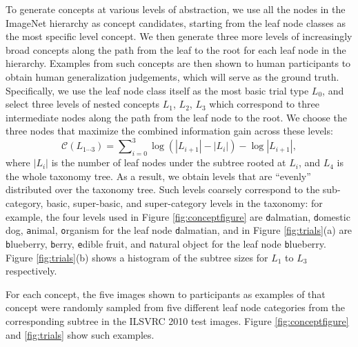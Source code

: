 To generate concepts at various levels of abstraction, we use all the nodes in the ImageNet hierarchy as concept candidates, starting from the leaf node classes as the most specific level concept. We then generate three more levels of increasingly broad concepts along the path from the leaf to the root for each leaf node in the hierarchy. Examples from such concepts are then shown to human participants to obtain human generalization judgements, which will serve as the ground truth. Specifically, we use the leaf node class itself as the most basic trial type $L_0$, and select three levels of nested concepts $L_1$, $L_2$, $L_3$ which correspond to three intermediate nodes along the path from the leaf node to the root. We choose the three nodes that maximize the combined information gain across these levels:
\begin{equation}
    \mathcal{C}(L_{1\cdots 3}) = \sum\nolimits_{i=0}^{3} \log(|L_{i+1}| - |L_{i}|) - \log|L_{i+1}|,
\end{equation}
where $|L_i|$ is the number of leaf nodes under the subtree rooted at $L_i$, and $L_4$ is the whole taxonomy tree. As a result, we obtain levels that are ``evenly'' distributed over the taxonomy tree. Such levels coarsely correspond to the sub-category, basic, super-basic, and super-category levels in the taxonomy: for example, the four levels used in Figure \ref{fig:conceptfigure} are {\texttt dalmatian}, {\texttt domestic dog}, {\texttt animal}, {\texttt organism} for the leaf node {\texttt dalmatian}, and in Figure \ref{fig:trials}(a) are {\texttt blueberry}, {\texttt berry}, {\texttt edible fruit}, and {\texttt natural object} for the leaf node {\texttt blueberry}. Figure \ref{fig:trials}(b) shows a histogram of the subtree sizes for $L_1$ to $L_3$ respectively.

For each concept, the five images shown to participants as examples of that concept were randomly sampled from five different leaf node categories from the corresponding subtree in the ILSVRC 2010 test images. Figure \ref{fig:conceptfigure} and \ref{fig:trials} show such examples.

